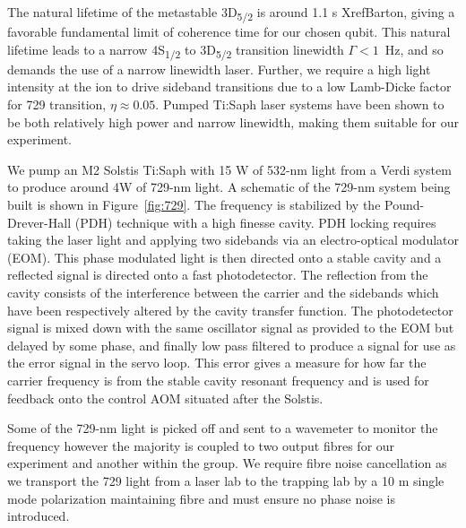 \documentclass[12pt]{iopart}
\begin{document}
The natural lifetime of the metastable
3D\textsubscript{5/2} is around 1.1 s XrefBarton, giving a favorable
fundamental limit of coherence time for our chosen qubit.
This natural lifetime leads to a narrow 4S\textsubscript{1/2} to
3D\textsubscript{5/2} transition linewidth $\Gamma < 1$~Hz, and so
demands the use of a narrow linewidth laser. Further, we require a
high light intensity at the ion to drive sideband transitions due to a low
Lamb-Dicke factor for 729 transition, $\eta \approx 0.05$.
Pumped Ti:Saph laser systems have been shown to be both relatively
high power and narrow linewidth, making them suitable for our
experiment.

We pump an M2 Solstis Ti:Saph with 15 W of 532-nm light from a Verdi
system to produce around 4W of 729-nm light.  A schematic of the
729-nm system being built is shown in Figure~\ref{fig:729}. The
frequency is
stabilized by the Pound-Drever-Hall (PDH) technique with a high
finesse cavity. PDH locking requires taking the laser light and
applying two sidebands via an electro-optical modulator (EOM). This
phase modulated light is then directed onto a stable cavity and a
reflected signal is directed onto a fast photodetector. The reflection
from the cavity consists of the interference between the carrier and
the sidebands which have been respectively altered by the cavity
transfer function. The photodetector signal is mixed down with the
same oscillator signal as provided to the EOM but delayed by some
phase, and finally low pass filtered to produce a signal for use as
the error signal in the servo loop.  This error gives a measure for
how far the carrier frequency is from the stable cavity resonant
frequency and is used for feedback onto the control AOM situated after
the Solstis.

Some of the 729-nm light is picked off and sent to a wavemeter to
monitor the frequency however the majority is coupled to two output
fibres for our experiment and another within the group. We require
fibre noise cancellation as we transport the 729 light from a laser
lab to the trapping lab by a 10 m single mode polarization maintaining
fibre and must ensure no phase noise is introduced.


\end{document}
